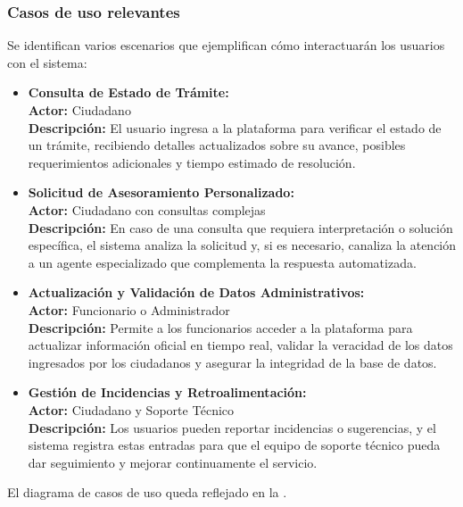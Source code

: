 \subsubsection{Casos de uso relevantes}
Se identifican varios escenarios que ejemplifican cómo interactuarán los usuarios con el sistema:
\begin{itemize}
    \item \textbf{Consulta de Estado de Trámite:} \\
    \textbf{Actor:} Ciudadano \\
    \textbf{Descripción:} El usuario ingresa a la plataforma para verificar el estado de un trámite, recibiendo detalles actualizados sobre su avance, posibles requerimientos adicionales y tiempo estimado de resolución.
    \item \textbf{Solicitud de Asesoramiento Personalizado:} \\
    \textbf{Actor:} Ciudadano con consultas complejas \\
    \textbf{Descripción:} En caso de una consulta que requiera interpretación o solución específica, el sistema analiza la solicitud y, si es necesario, canaliza la atención a un agente especializado que complementa la respuesta automatizada.
    \item \textbf{Actualización y Validación de Datos Administrativos:} \\
    \textbf{Actor:} Funcionario o Administrador \\
    \textbf{Descripción:} Permite a los funcionarios acceder a la plataforma para actualizar información oficial en tiempo real, validar la veracidad de los datos ingresados por los ciudadanos y asegurar la integridad de la base de datos.
    \item \textbf{Gestión de Incidencias y Retroalimentación:} \\
    \textbf{Actor:} Ciudadano y Soporte Técnico \\
    \textbf{Descripción:} Los usuarios pueden reportar incidencias o sugerencias, y el sistema registra estas entradas para que el equipo de soporte técnico pueda dar seguimiento y mejorar continuamente el servicio.
\end{itemize}

El diagrama de casos de uso queda reflejado en la .




